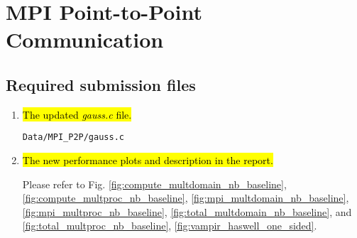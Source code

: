 \section{MPI Point-to-Point Communication}
\subsection{Required submission files}
\begin{enumerate}
	\item \hl{The updated \emph{gauss.c} file.}

		\verb!Data/MPI_P2P/gauss.c!

	\item \hl{The new performance plots and description in the report.}

		Please refer to Fig. \ref{fig:compute_multdomain_nb_baseline}, \ref{fig:compute_multproc_nb_baseline}, \ref{fig:mpi_multdomain_nb_baseline}, \ref{fig:mpi_multproc_nb_baseline}, \ref{fig:total_multdomain_nb_baseline}, and \ref{fig:total_multproc_nb_baseline}, \ref{fig:vampir_haswell_one_sided}.

\end{enumerate}

